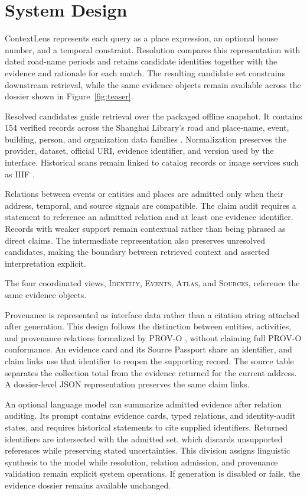 \documentclass[letterpaper]{article} %
\begin{document}
\section{System Design}
ContextLens represents each query as a place expression, an optional house number, and a temporal constraint. Resolution compares this representation with dated road-name periods and retains candidate identities together with the evidence and rationale for each match. The resulting candidate set constrains downstream retrieval, while the same evidence objects remain available across the dossier shown in Figure~\ref{fig:teaser}.

Resolved candidates guide retrieval over the packaged offline snapshot. It contains 154 verified records across the Shanghai Library's road and place-name, event, building, person, and organization data families \cite{shlibrary2026data}. Normalization preserves the provider, dataset, official URI, evidence identifier, and version used by the interface. Historical scans remain linked to catalog records or image services such as IIIF \cite{iiif2020image}.

Relations between events or entities and places are admitted only when their address, temporal, and source signals are compatible. The claim audit requires a statement to reference an admitted relation and at least one evidence identifier. Records with weaker support remain contextual rather than being phrased as direct claims. The intermediate representation also preserves unresolved candidates, making the boundary between retrieved context and asserted interpretation explicit.

The four coordinated views, \textsc{Identity}, \textsc{Events}, \textsc{Atlas}, and \textsc{Sources}, reference the same evidence objects.

Provenance is represented as interface data rather than a citation string attached after generation. This design follows the distinction between entities, activities, and provenance relations formalized by PROV-O \cite{lebo2013provo}, without claiming full PROV-O conformance. An evidence card and its Source Passport share an identifier, and claim links use that identifier to reopen the supporting record. The source table separates the collection total from the evidence returned for the current address. A dossier-level JSON representation preserves the same claim links.

An optional language model can summarize admitted evidence after relation auditing. Its prompt contains evidence cards, typed relations, and identity-audit states, and requires historical statements to cite supplied identifiers. Returned identifiers are intersected with the admitted set, which discards unsupported references while preserving stated uncertainties. This division assigns linguistic synthesis to the model while resolution, relation admission, and provenance validation remain explicit system operations. If generation is disabled or fails, the evidence dossier remains available unchanged.
\end{document}
